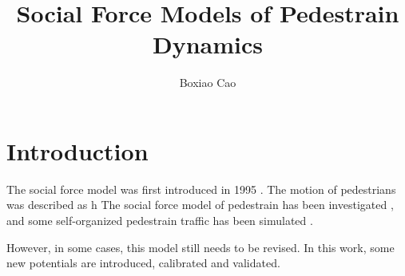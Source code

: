 \documentclass{article}
\begin{document}
	\title{Social Force Models of Pedestrain Dynamics}
	\author{Boxiao Cao}
	\maketitle
	\section{Introduction}
		The social force model was first introduced in 1995 \cite{helbing1995social}. The motion of pedestrians was described as h
		The social force model of pedestrain has been investigated \cite{helbing1995social,helbing1998generalized},
		and some self-organized pedestrain traffic has been simulated \cite{helbing2005self}.

		However, in some cases, this model still needs to be revised. In this work, some new potentials are introduced, calibrated and validated.

	\renewcommand\refname{Reference}
	
\end{document}
